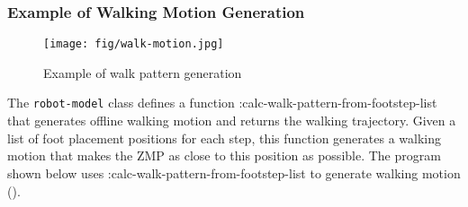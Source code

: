 \subsubsection{Example of Walking Motion Generation}
\begin{figure}[htb]
  \begin{center}
    \texttt{[image: fig/walk-motion.jpg]}
    \caption{Example of walk pattern generation}
  \end{center}
\end{figure}

The \verb|robot-model| class defines a function :calc-walk-pattern-from-footstep-list that generates offline walking motion and returns the walking trajectory. Given a list of foot placement positions for each step, this function generates a walking motion that makes the ZMP as close to this position as possible. The program shown below uses :calc-walk-pattern-from-footstep-list to generate walking motion ().

